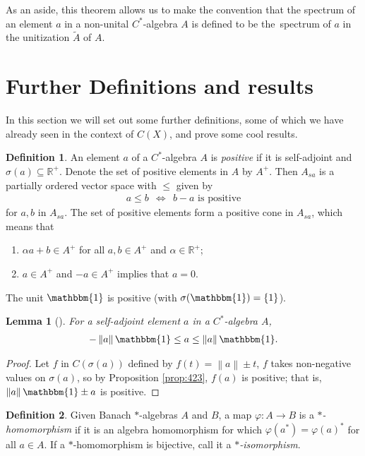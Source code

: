 \documentclass[11pt,a4paper]{report}
\theoremstyle{plain}
\newtheorem{lemma}{Lemma}
\theoremstyle{definition}
\newtheorem{defn}{Definition}
\newcommand{\1}{\mathbbm{1}}
\newcommand{\R}{\mathbb{R}}
\renewcommand{\phi}{\varphi}
\newcommand{\CX}{C(X)}
\newcommand{\spec}[1]{\sigma(#1)}
\begin{document}
As an aside, this theorem allows us to make the convention that the spectrum of an element $a$ in a 
non-unital $C^\ast$-algebra $A$ is defined to be the~spectrum of $a$ in the unitization $\tilde A$ 
of $A$.




\section{Further Definitions and results}
In this section we will set out some further definitions, some of which we have already seen in the context of $\CX$, and prove some cool results.

\begin{defn}
	An element $a$ of a $C^\ast$-algebra $A$ is \emph{positive} if it is self-adjoint and $\spec a
	\subseteq \R^+$. 
	Denote the set of positive elements in $A$ by $A^+$. Then $A_{sa}$ is a partially ordered vector space 
	with $\leq$ given by 
	\begin{align*}
		a\leq b ~~\iff~~ b-a \mbox{ is positive}
	\end{align*}
	for $a,b$ in $A_{sa}$.
	The set of positive elements form a positive cone in $A_{sa}$, which means that 
	\begin{enumerate}
		\item 	$\alpha a+b\in A^+$ for all $a,b \in A^+$ and $\alpha\in \R^+$;
		\item	$a\in A^+$ and $-a\in A^+$ implies that $a=0$.
	\end{enumerate}
\end{defn}

The unit $\1$ is positive (with $\spec \1 = \left\{1\right\}$). 

\begin{lemma}[{\cite[4.2.3(ii)]{kadison83}}]\label{lemma:423}
	For a self-adjoint element $a$ in a $C^\ast$-algebra $A$, 
	\begin{align*}
		-\left\|a\right\|\1 \leq a\leq\left\|a\right\|\1.
	\end{align*}
\end{lemma}
\begin{proof}
	Let $f$ in $C(\spec a)$ defined by $f(t) = \left\|a\right\| \pm t$, $f$ takes non-negative values on $\spec a$, so by Proposition \ref{prop:423}, $f(a)$ is positive; that is, $\left\|a\right\|\1 \pm a$ is positive.
\end{proof}
	
\begin{defn}
	Given Banach $\ast$-algebras $A$ and $B$, a map $\phi:A\to B$ is a \emph{$\ast$-homomorphism} 
	if it is an algebra homomorphism for which $\phi(a^\ast) = \phi(a)^\ast$ for all $a \in A$.
	If a $\ast$-homomorphism is bijective, call it a \emph{$\ast$-isomorphism}.
\end{defn}
\end{document}
